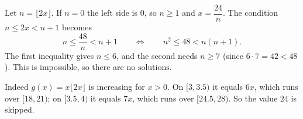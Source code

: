 Let $n=\lfloor2x\rfloor$. If $n=0$ the left side is $0$, so $n\ge1$ and $x=\dfrac{24}{n}$. The condition $n\le2x<n+1$ becomes
\[n\le\dfrac{48}{n}<n+1\qquad\Longleftrightarrow\qquad n^2\le48<n(n+1).\]
The first inequality gives $n\le6$, and the second needs $n\ge7$ (since $6\cdot7=42<48$). This is impossible, so there are $\boxed{\text{no solutions}}$.

Indeed $g(x)=x\lfloor2x\rfloor$ is increasing for $x>0$. On $[3,3.5)$ it equals $6x$, which runs over $[18,21)$; on $[3.5,4)$ it equals $7x$, which runs over $[24.5,28)$. So the value $24$ is skipped.
